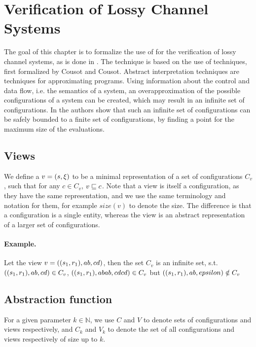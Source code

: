 \newpage
\section{Verification of Lossy Channel Systems}
\label{model}
The goal of this chapter is to formalize the use of  for the verification of lossy channel systems, as is done in \cite{parosh}. The technique is based on the use of  techniques, first formalized by Cousot and Cousot\cite{cousot1977}. Abstract interpretation techniques are techniques for approximating programs. Using information about the control and data flow, i.e. the semantics of a system, an overapproximation of the possible configurations of a system can be created, which may result in an infinite set of configurations. In \cite{parosh} the authors show that such an infinite set of configurations can be safely bounded to a finite set of configurations, by finding a  point for the maximum size of the evaluations.


\subsection{Views}
\label{subwords}
We define a  $v= (s, \xi)$ to be a minimal representation of a set of configurations $C_v$, such that for any $c \in C_v$, $v \sqsubseteq c$. Note that a view is itself a configuration, as they have the same representation, and we use the same terminology and notation for them, for example $size(v)$ to denote the size. The difference is that a configuration is a single entity, whereas the view is an abstract representation of a larger set of configurations.

\paragraph{Example.} Let the view $v = ((s_1, r_1), ab, cd)$, then the set $C_v$ is an infinite set, s.t. $((s_1, r_1), ab, cd) \in C_v$, $((s_1, r_1), abab, cdcd) \in C_v$ but $((s_1, r_1), ab, epsilon) \notin C_v$


\subsection{Abstraction function}
\label{alphagamma}
For a given parameter $k \in \mathbb{N}$, we use $C$ and $V$ to denote sets of configurations and views respectively, and $C_k$ and $V_k$ to denote the set of all configurations and views respectively of size up to $k$.


